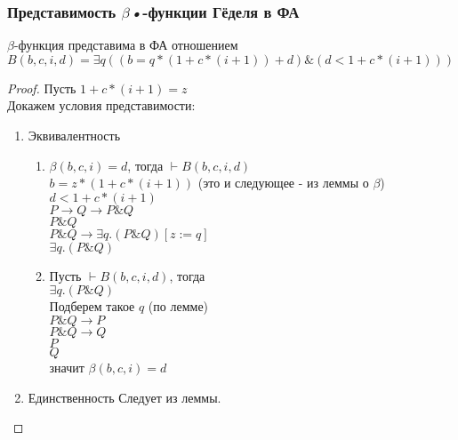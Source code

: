 \subsubsection{Представимость \emph{\texorpdfstring{$\beta$}{бета}\emph{•}}-функции Гёделя в ФА}
\label{sec-11-3-4}
\begin{lemma}
$\beta$-функция представима в ФА отношением\\
$B(b,c,i,d) = \exists q((b = q * (1 + c * (i + 1)) + d) \& (d < 1 + c * (i + 1)))$
\end{lemma}
\begin{proof}
Пусть $1 + c * (i + 1) = z$\\
Докажем условия представимости:
\begin{enumerate}
\item Эквивалентность
\begin{enumerate}
\item $\beta(b,c,i) = d$, тогда $\vdash B(b,c,i,d)$\\
$b = z * (1 + c * (i + 1))$ (это и следующее - из леммы о $\beta$)\\
$d < 1 + c * (i + 1)$\\
$P \to Q \to P \& Q$\\
$P \& Q$\\
$P \& Q \to \exists q.(P \& Q) [z:= q]$\\
$\exists q.(P \& Q)$
\item Пусть $\vdash B(b,c,i,d)$, тогда\\
$\exists q.(P \& Q)$\\
Подберем такое $q$ (по лемме)\\
$P \& Q \to P$\\
$P \& Q \to Q$\\
$P$\\
$Q$\\
значит $\beta(b,c,i) = d$
\end{enumerate}
\item Единственность
Следует из леммы.
\end{enumerate}
\end{proof}
